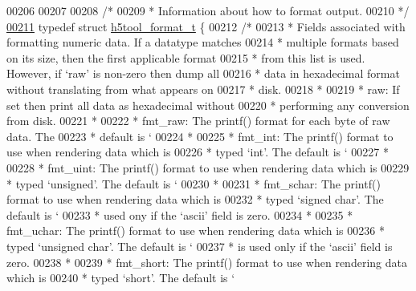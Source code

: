 \begin{DoxyCode}
{00206 
00207 
00208 \textcolor{comment}{/*}
00209 \textcolor{comment}{ * Information about how to format output.}
00210 \textcolor{comment}{ */}
\hyperlink{structh5tool__format__t}{00211} \textcolor{keyword}{typedef} \textcolor{keyword}{struct }\hyperlink{structh5tool__format__t}{h5tool\_format\_t} \{
00212     \textcolor{comment}{/*}
00213 \textcolor{comment}{     * Fields associated with formatting numeric data.  If a datatype matches}
00214 \textcolor{comment}{     * multiple formats based on its size, then the first applicable format}
00215 \textcolor{comment}{     * from this list is used. However, if `raw' is non-zero then dump all}
00216 \textcolor{comment}{     * data in hexadecimal format without translating from what appears on}
00217 \textcolor{comment}{     * disk.}
00218 \textcolor{comment}{     *}
00219 \textcolor{comment}{     *   raw:        If set then print all data as hexadecimal without}
00220 \textcolor{comment}{     *               performing any conversion from disk.}
00221 \textcolor{comment}{     *}
00222 \textcolor{comment}{     *   fmt\_raw:    The printf() format for each byte of raw data. The}
00223 \textcolor{comment}{     *               default is `%
00224 \textcolor{comment}{     *}
00225 \textcolor{comment}{     *   fmt\_int:    The printf() format to use when rendering data which is}
00226 \textcolor{comment}{     *               typed `int'. The default is `%
00227 \textcolor{comment}{     *}
00228 \textcolor{comment}{     *   fmt\_uint:   The printf() format to use when rendering data which is}
00229 \textcolor{comment}{     *               typed `unsigned'. The default is `%
00230 \textcolor{comment}{     *}
00231 \textcolor{comment}{     *   fmt\_schar:  The printf() format to use when rendering data which is}
00232 \textcolor{comment}{     *               typed `signed char'. The default is `%
00233 \textcolor{comment}{     *               used ony if the `ascii' field is zero.}
00234 \textcolor{comment}{     *}
00235 \textcolor{comment}{     *   fmt\_uchar:  The printf() format to use when rendering data which is}
00236 \textcolor{comment}{     *               typed `unsigned char'. The default is `%
00237 \textcolor{comment}{     *               is used only if the `ascii' field is zero.}
00238 \textcolor{comment}{     *}
00239 \textcolor{comment}{     *   fmt\_short:  The printf() format to use when rendering data which is}
00240 \textcolor{comment}{     *               typed `short'. The default is `%
}}}}}}}
\end{DoxyCode}
